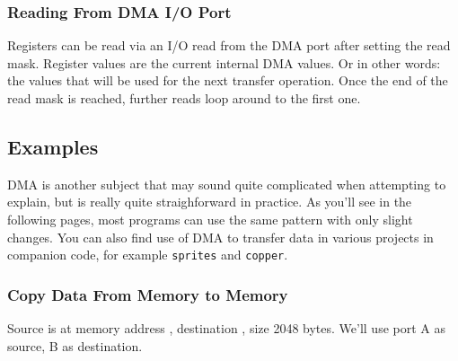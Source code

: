 {\begin{DMADescription}


	
\end{DMADescription}


\subsubsection{Reading From DMA I/O Port}

Registers can be read via an I/O read from the DMA port after setting the read mask. Register values are the current internal DMA values. Or in other words: the values that will be used for the next transfer operation. Once the end of the read mask is reached, further reads loop around to the first one.


\subsection{Examples}

DMA is another subject that may sound quite complicated when attempting to explain, but is really quite straighforward in practice. As you'll see in the following pages, most programs can use the same pattern with only slight changes. You can also find use of DMA to transfer data in various projects in companion code, for example {\tt sprites} and {\tt copper}.


\pagebreak
\subsubsection{Copy Data From Memory to Memory}

Source is at memory address , destination , size 2048 bytes. We'll use port A as source, B as destination.

}
